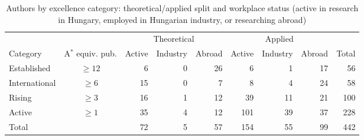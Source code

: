 \begin{table}[h]
  \centering
  \caption{Authors by excellence category: theoretical/applied split and workplace status (active in research in Hungary, employed in Hungarian industry, or researching abroad)}
  \label{tab:excellence_summary}
  \begin{small}
  \begin{tabular}{lc|rrr|rrr|r}
    \hline
     & & \multicolumn{3}{c|}{Theoretical} & \multicolumn{3}{c|}{Applied} & \\
    Category &A$^*$ equiv. pub. & Active & Industry & Abroad & Active & Industry & Abroad & Total \\
    \hline
    Established & $\geq12$ & 6 & 0 & 26 & 6 & 1 & 17 & 56 \\
    International & $\geq6$ & 15 & 0 & 7 & 8 & 4 & 24 & 58 \\
    Rising & $\geq3$ & 16 & 1 & 12 & 39 & 11 & 21 & 100 \\
    Active & $\geq1$ & 35 & 4 & 12 & 101 & 39 & 37 & 228 \\
    \hline
    Total & &72 & 5 & 57 & 154 & 55 & 99 & 442 \\
    \hline
  \end{tabular}
  \end{small}
\end{table}